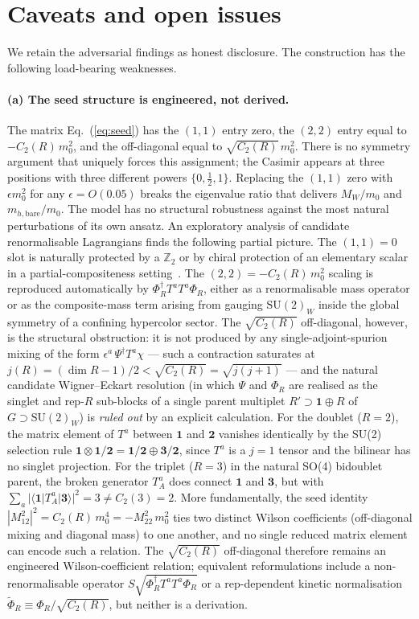 \documentclass[%
 aps,
 prd,
 reprint,
 nofootinbib,
 superscriptaddress,
 amsmath,
 amssymb,
]{revtex4-2}
\begin{document}
\section{Caveats and open issues}\label{sec:caveats}

We retain the adversarial findings as honest disclosure. The construction has the following load-bearing weaknesses.

\paragraph{(a) The seed structure is engineered, not derived.} The matrix Eq.~(\ref{eq:seed}) has the $(1,1)$ entry zero, the $(2,2)$ entry equal to $-C_2(R)\,m_0^2$, and the off-diagonal equal to $\sqrt{C_2(R)}\,m_0^2$. There is no symmetry argument that uniquely forces this assignment; the Casimir appears at three positions with three different powers $\{0,\tfrac12,1\}$. Replacing the $(1,1)$ zero with $\epsilon m_0^2$ for any $\epsilon=O(0.05)$ breaks the eigenvalue ratio that delivers $M_W/m_0$ and $m_{h,\mathrm{bare}}/m_0$. The model has no structural robustness against the most natural perturbations of its own ansatz. An exploratory analysis of candidate renormalisable Lagrangians finds the following partial picture. The $(1,1)=0$ slot is naturally protected by a $\mathbb{Z}_2$ or by chiral protection of an elementary scalar in a partial-compositeness setting~\cite{Caracciolo2013PC}. The $(2,2)=-C_2(R)\,m_0^2$ scaling is reproduced automatically by $\Phi_R^\dagger T^a T^a\Phi_R$, either as a renormalisable mass operator or as the composite-mass term arising from gauging $\mathrm{SU}(2)_W$ inside the global symmetry of a confining hypercolor sector. The $\sqrt{C_2(R)}$ off-diagonal, however, is the structural obstruction: it is not produced by any single-adjoint-spurion mixing of the form $\epsilon^a\,\Psi^\dagger T^a\chi$ --- such a contraction saturates at $j(R)=(\dim R-1)/2<\sqrt{C_2(R)}=\sqrt{j(j+1)}$ --- and the natural candidate Wigner--Eckart resolution (in which $\Psi$ and $\Phi_R$ are realised as the singlet and rep-$R$ sub-blocks of a single parent multiplet $R'\supset\mathbf{1}\oplus R$ of $G\supset\mathrm{SU}(2)_W$) is \emph{ruled out} by an explicit calculation. For the doublet ($R=2$), the matrix element of $T^a$ between $\mathbf{1}$ and $\mathbf{2}$ vanishes identically by the SU(2) selection rule $\mathbf{1}\otimes\mathbf{1/2}=\mathbf{1/2}\oplus\mathbf{3/2}$, since $T^a$ is a $j=1$ tensor and the bilinear has no singlet projection. For the triplet ($R=3$) in the natural SO(4) bidoublet parent, the broken generator $T_A^a$ does connect $\mathbf{1}$ and $\mathbf{3}$, but with $\sum_a|\langle\mathbf{1}|T_A^a|\mathbf{3}\rangle|^2 = 3 \neq C_2(3)=2$. More fundamentally, the seed identity $|M^2_{12}|^2 = C_2(R)\,m_0^4 = -M^2_{22}\,m_0^2$ ties two distinct Wilson coefficients (off-diagonal mixing and diagonal mass) to one another, and no single reduced matrix element can encode such a relation. The $\sqrt{C_2(R)}$ off-diagonal therefore remains an engineered Wilson-coefficient relation; equivalent reformulations include a non-renormalisable operator $S\sqrt{\Phi_R^\dagger T^a T^a\Phi_R}$ or a rep-dependent kinetic normalisation $\tilde\Phi_R\equiv\Phi_R/\sqrt{C_2(R)}$, but neither is a derivation.
\end{document}
